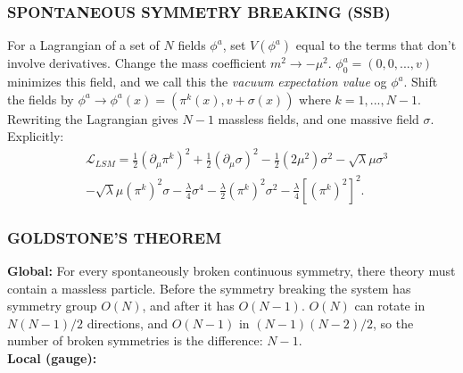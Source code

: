 \documentclass[a4paper, norsk, 8pt, landscape]{article}
\newcommand{\EQU}[1] { \begin{equation*} \begin{split}
#1
\end{split} \end{equation*} }
\begin{document}
\begin{multicols*}{3}
\subsubsection*{\small SPONTANEOUS SYMMETRY BREAKING (SSB)}
For a Lagrangian of a set of $N$ fields $\phi^a$, set $V(\phi^a)$ equal to the
terms that don't involve derivatives. Change the mass coefficient
$m^2 \rightarrow - \mu^2$. $\phi^a_0=(0,0,...,v)$ minimizes this field, and we
call this the \textit{vacuum expectation value} og $\phi^a$. Shift the fields by
$\phi^a \rightarrow \phi^a(x) = (\pi^k(x), v+ \sigma(x))$ where $k=1,...,N-1$.
Rewriting the Lagrangian gives $N-1$ massless fields, and one massive field $\sigma$.
Explicitly:
\EQU{
&\mathcal{L}_{LSM} =
\frac{1}{2}(\partial_\mu\pi^k)^2+\frac{1}{2}(\partial_\mu \sigma)^2
-\frac{1}{2}(2\mu^2)\sigma^2-\sqrt{\lambda}\mu\sigma^3\\
&-\sqrt{\lambda}\mu (\pi^k)^2 \sigma - \frac{\lambda}{4}\sigma^4
-\frac{\lambda}{2}(\pi^k)^2 \sigma^2-\frac{\lambda}{4}[(\pi^k)^2]^2.
}



\subsubsection*{\small GOLDSTONE'S THEOREM}
{\textbf{Global:}}
For every spontaneously broken continuous symmetry, there theory must contain a
massless particle. Before the symmetry breaking the system has symmetry group
$O(N)$, and after it has $O(N-1)$. $O(N)$ can rotate in $N(N-1)/2$  directions,
and $O(N-1)$ in $(N-1)(N-2)/2$, so the number of broken symmetries is the
difference: $N-1$.
\\
{\textbf{Local (gauge):}}



\end{multicols*}
\end{document}
